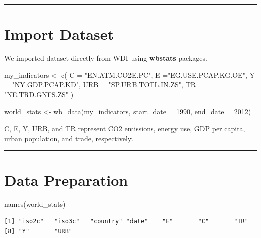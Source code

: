\documentclass[
  11pt,
]{article}
\newenvironment{Shaded}{\begin{snugshade}}{\end{snugshade}}
\newcommand{\AttributeTok}[1]{\textcolor[rgb]{0.40,0.45,0.13}{#1}}
\newcommand{\DecValTok}[1]{\textcolor[rgb]{0.68,0.00,0.00}{#1}}
\newcommand{\FunctionTok}[1]{\textcolor[rgb]{0.28,0.35,0.67}{#1}}
\newcommand{\NormalTok}[1]{\textcolor[rgb]{0.00,0.23,0.31}{#1}}
\newcommand{\OtherTok}[1]{\textcolor[rgb]{0.00,0.23,0.31}{#1}}
\newcommand{\StringTok}[1]{\textcolor[rgb]{0.13,0.47,0.30}{#1}}
\begin{document}
\begin{center}\rule{0.5\linewidth}{0.5pt}\end{center}

\hypertarget{import-dataset}{%
\section{Import Dataset}\label{import-dataset}}

We imported dataset directly from WDI using \textbf{wbstats} packages.

\begin{Shaded}
\begin{Highlighting}[]
\NormalTok{my\_indicators }\OtherTok{\textless{}{-}} \FunctionTok{c}\NormalTok{(                         }
  \AttributeTok{C =} \StringTok{"EN.ATM.CO2E.PC"}\NormalTok{,  }
  \AttributeTok{E =}\StringTok{"EG.USE.PCAP.KG.OE"}\NormalTok{,  }
  \AttributeTok{Y =} \StringTok{"NY.GDP.PCAP.KD"}\NormalTok{, }
  \AttributeTok{URB =} \StringTok{"SP.URB.TOTL.IN.ZS"}\NormalTok{, }
  \AttributeTok{TR =} \StringTok{"NE.TRD.GNFS.ZS"} 
\NormalTok{)}

\NormalTok{world\_stats }\OtherTok{\textless{}{-}} \FunctionTok{wb\_data}\NormalTok{(my\_indicators, }\AttributeTok{start\_date =} \DecValTok{1990}\NormalTok{, }\AttributeTok{end\_date =} \DecValTok{2012}\NormalTok{) }
\end{Highlighting}
\end{Shaded}

C, E, Y, URB, and TR represent CO2 emissions, energy use, GDP per
capita, urban population, and trade, respectively.

\begin{center}\rule{0.5\linewidth}{0.5pt}\end{center}

\hypertarget{data-preparation}{%
\section{Data Preparation}\label{data-preparation}}

\begin{Shaded}
\begin{Highlighting}[]
\FunctionTok{names}\NormalTok{(world\_stats)}
\end{Highlighting}
\end{Shaded}

\begin{verbatim}
[1] "iso2c"   "iso3c"   "country" "date"    "E"       "C"       "TR"     
[8] "Y"       "URB"    
\end{verbatim}
\end{document}
